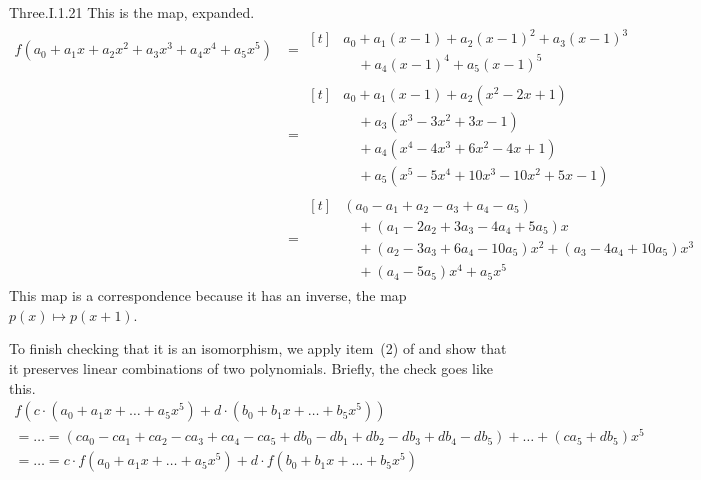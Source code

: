 \begin{ans}{Three.I.1.21}
      This is the map, expanded.
      \begin{align*}
        f(a_0+a_1x+a_2x^2+a_3x^3+a_4x^4+a_5x^5)
        &=\begin{aligned}[t]
             &a_0+a_1(x-1)+a_2(x-1)^2+a_3(x-1)^3 \\
             &\mbox{}\quad +a_4(x-1)^4+a_5(x-1)^5
          \end{aligned}                                          \\
        &=\begin{aligned}[t]
             &a_0+a_1(x-1)+a_2(x^2-2x+1)         \\
             &\mbox{}\quad +a_3(x^3-3x^2+3x-1)   \\
             &\mbox{}\quad +a_4(x^4-4x^3+6x^2-4x+1) \\
             &\mbox{}\quad +a_5(x^5-5x^4+10x^3-10x^2+5x-1)
           \end{aligned}   \\
        &=\begin{aligned}[t]
           &(a_0-a_1+a_2-a_3+a_4-a_5)  \\
           &\mbox{}\quad +(a_1-2a_2+3a_3-4a_4+5a_5)x  \\
           &\mbox{}\quad +(a_2-3a_3+6a_4-10a_5)x^2
                        +(a_3-4a_4+10a_5)x^3         \\
           &\mbox{}\quad +(a_4-5a_5)x^4
                        +a_5x^5
          \end{aligned}
      \end{align*}
      This map is a correspondence because it has an inverse, the map
      \( p(x)\mapsto p(x+1) \).

      To finish checking that it is an isomorphism, we apply
      item~(2) of  and show
      that it preserves linear combinations of two polynomials.
      Briefly, the check goes like this.
      \begin{multline*}
        f(c\cdot (a_0+a_1x+\dots +a_5x^5)+d\cdot (b_0+b_1x+\dots +b_5x^5))  \\
         =\dots=
         (ca_0-ca_1+ca_2-ca_3+ca_4-ca_5+db_0-db_1+db_2-db_3+db_4-db_5)
          +\dots+(ca_5+db_5)x^5                                 \\
         =\dots=
         c\cdot f(a_0+a_1x+\dots +a_5x^5)+d\cdot f(b_0+b_1x+\dots +b_5x^5)
      \end{multline*}
    
\end{ans}
